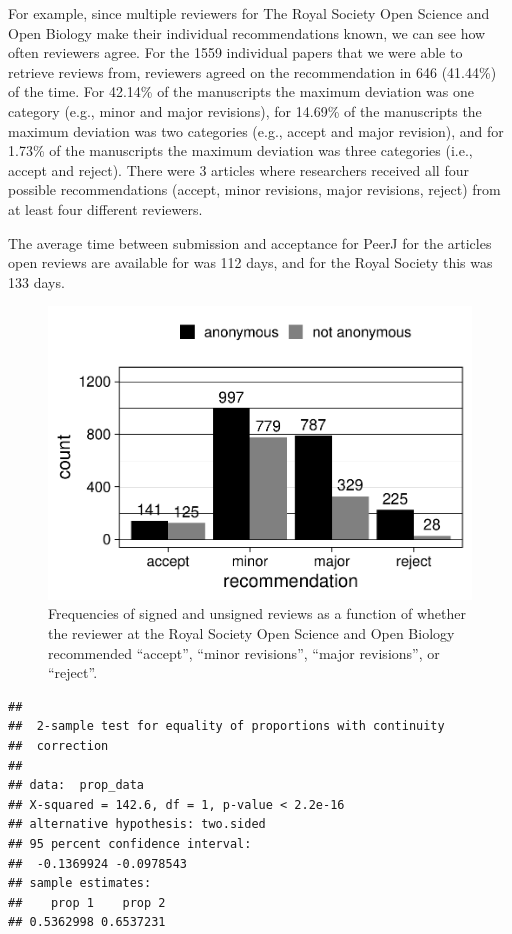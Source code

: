 \documentclass[,jou, a4paper,floatsintext]{apa6}
\begin{document}
For example, since multiple reviewers for The Royal Society Open Science and Open Biology make their individual recommendations known, we can see how often reviewers agree. For the 1559 individual papers that we were able to retrieve reviews from, reviewers agreed on the recommendation in 646 (41.44\%) of the time. For 42.14\% of the manuscripts the maximum deviation was one category (e.g., minor and major revisions), for 14.69\% of the manuscripts the maximum deviation was two categories (e.g., accept and major revision), and for 1.73\% of the manuscripts the maximum deviation was three categories (i.e., accept and reject). There were 3 articles where researchers received all four possible recommendations (accept, minor revisions, major revisions, reject) from at least four different reviewers.

The average time between submission and acceptance for PeerJ for the articles open reviews are available for was 112 days, and for the Royal Society this was 133 days.

\begin{figure}
\centering
\includegraphics{open_peer_review_files/figure-latex/TRSrec-1.pdf}
\caption{\label{fig:TRSrec}Frequencies of signed and unsigned reviews as a function of whether the reviewer at the Royal Society Open Science and Open Biology recommended \enquote{accept}, \enquote{minor revisions}, \enquote{major revisions}, or \enquote{reject}.}
\end{figure}

\begin{verbatim}
## 
##  2-sample test for equality of proportions with continuity
##  correction
## 
## data:  prop_data
## X-squared = 142.6, df = 1, p-value < 2.2e-16
## alternative hypothesis: two.sided
## 95 percent confidence interval:
##  -0.1369924 -0.0978543
## sample estimates:
##    prop 1    prop 2 
## 0.5362998 0.6537231
\end{verbatim}
\end{document}
